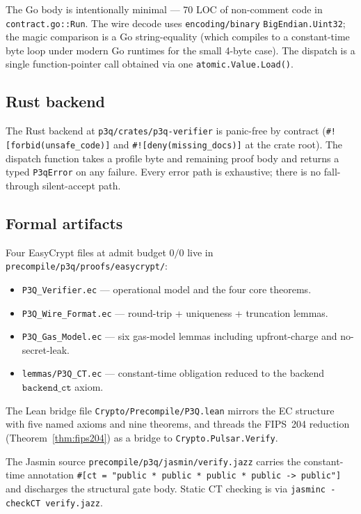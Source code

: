 \documentclass[11pt,a4paper]{article}
\begin{document}
The Go body is intentionally minimal — 70 LOC of non-comment code in
\texttt{contract.go::Run}. The wire decode uses
\texttt{encoding/binary} \texttt{BigEndian.Uint32}; the magic
comparison is a Go string-equality (which compiles to a constant-time
byte loop under modern Go runtimes for the small 4-byte case). The
dispatch is a single function-pointer call obtained via one
\texttt{atomic.Value.Load()}.

\subsection{Rust backend}

The Rust backend at \texttt{p3q/crates/p3q-verifier} is panic-free by
contract (\texttt{\#![forbid(unsafe\_code)]} and
\texttt{\#![deny(missing\_docs)]} at the crate root). The dispatch
function takes a profile byte and remaining proof body and returns a
typed \texttt{P3qError} on any failure. Every error path is
exhaustive; there is no fall-through silent-accept path.

\subsection{Formal artifacts}

Four EasyCrypt files at admit budget $0/0$ live in
\texttt{precompile/p3q/proofs/easycrypt/}:
\begin{itemize}
\item \texttt{P3Q\_Verifier.ec} — operational model and the four
core theorems.
\item \texttt{P3Q\_Wire\_Format.ec} — round-trip + uniqueness +
truncation lemmas.
\item \texttt{P3Q\_Gas\_Model.ec} — six gas-model lemmas including
upfront-charge and no-secret-leak.
\item \texttt{lemmas/P3Q\_CT.ec} — constant-time obligation reduced
to the backend $\mathtt{backend\_ct}$ axiom.
\end{itemize}

The Lean bridge file \texttt{Crypto/Precompile/P3Q.lean} mirrors the
EC structure with five named axioms and nine theorems, and threads
the FIPS~204 reduction (Theorem~\ref{thm:fips204}) as a bridge to
\texttt{Crypto.Pulsar.Verify}.

The Jasmin source \texttt{precompile/p3q/jasmin/verify.jazz} carries
the constant-time annotation
\texttt{\#[ct = "public * public * public * public -> public"]}
and discharges the structural gate body. Static CT checking is via
\texttt{jasminc -checkCT verify.jazz}.
\end{document}
